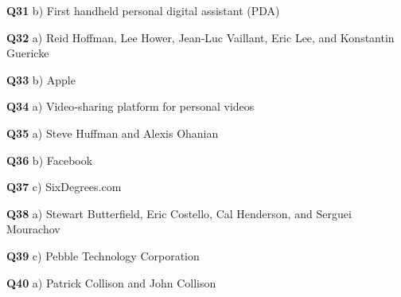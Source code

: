 \textbf{Q31} b) First handheld personal digital assistant (PDA)\par
\textbf{Q32} a) Reid Hoffman, Lee Hower, Jean‑Luc Vaillant, Eric Lee, and Konstantin Guericke\par
\textbf{Q33} b) Apple\par
\textbf{Q34} a) Video‑sharing platform for personal videos\par
\textbf{Q35} a) Steve Huffman and Alexis Ohanian\par
\textbf{Q36} b) Facebook\par
\textbf{Q37} c) SixDegrees.com\par
\textbf{Q38} a) Stewart Butterfield, Eric Costello, Cal Henderson, and Serguei Mourachov\par
\textbf{Q39} c) Pebble Technology Corporation\par
\textbf{Q40} a) Patrick Collison and John Collison\par